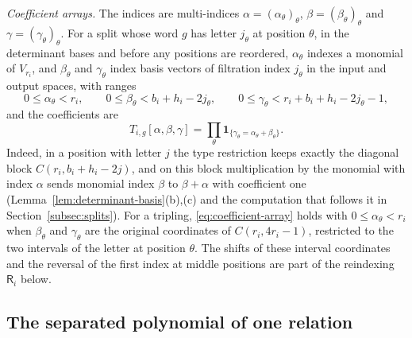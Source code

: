 \emph{Coefficient arrays.} The indices are multi-indices
\(\alpha=(\alpha_\theta)_\theta\), \(\beta=(\beta_\theta)_\theta\) and
\(\gamma=(\gamma_\theta)_\theta\). For a split whose word \(g\) has letter
\(j_\theta\) at position \(\theta\), in the determinant bases and before
any positions are reordered, \(\alpha_\theta\) indexes a monomial of
\(V_{r_i}\), and \(\beta_\theta\) and \(\gamma_\theta\) index basis vectors
of filtration index \(j_\theta\) in the input and output spaces, with
ranges
\begin{equation}\label{eq:coefficient-ranges}
 0\le\alpha_\theta<r_i,\qquad
 0\le\beta_\theta<b_i+h_i-2j_\theta,\qquad
 0\le\gamma_\theta<r_i+b_i+h_i-2j_\theta-1,
\end{equation}
and the coefficients are
\begin{equation}\label{eq:coefficient-array}
 T_{i,g}[\alpha,\beta,\gamma]=\prod_\theta
 \mathbf 1_{\{\gamma_\theta=\alpha_\theta+\beta_\theta\}}.
\end{equation}
Indeed, in a position with letter \(j\) the type restriction keeps exactly
the diagonal block \(C(r_i,b_i+h_i-2j)\), and on this block multiplication
by the monomial with index \(\alpha\) sends monomial index \(\beta\) to
\(\beta+\alpha\) with coefficient one
(Lemma~\ref{lem:determinant-basis}(b),(c) and the computation that
follows it in Section~\ref{subsec:splits}). For a tripling,
\eqref{eq:coefficient-array} holds with \(0\le\alpha_\theta<r_i\) when
\(\beta_\theta\) and \(\gamma_\theta\) are the original coordinates of
\(C(r_i,4r_i-1)\), restricted to the two intervals of the letter at
position \(\theta\). The shifts of these interval coordinates and the
reversal of the first index at middle positions are part of the
reindexing \(\mathsf R_i\) below.

\subsection{The separated polynomial of one relation}

